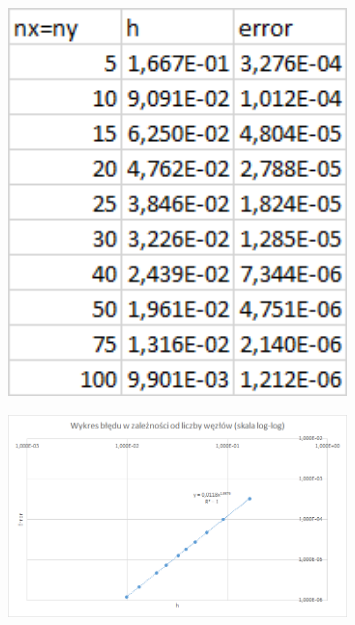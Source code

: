 \begin{figure}[!ht]
	\begin{center}
		\includegraphics[width=0.8\textwidth]{Lab5/charts/zad3/error_dane.png}
	\end{center}
\end{figure}

\begin{figure}[!ht]
	\begin{center}
		\includegraphics[width=0.8\textwidth]{Lab5/charts/zad3/error.png}
	\end{center}
\end{figure}


\newpage